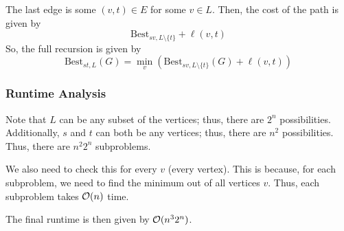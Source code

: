 \documentclass[letterpaper]{article}
\begin{document}
\bigskip 

The last edge is some $(v, t) \in E$ for some $v \in L$. Then, the cost of the path is given by 
\[\text{Best}_{sv, L \setminus \{t\}} + \ell(v, t)\]
So, the full recursion is given by 
\[\text{Best}_{st, L}(G) = \min_v \left(\text{Best}_{sv, L \setminus \{t\}}(G) + \ell(v, t)\right)\]

\subsubsection{Runtime Analysis}
Note that $L$ can be any subset of the vertices; thus, there are $2^n$ possibilities. Additionally, $s$ and $t$ can both be any vertices; thus, there are $n^2$ possibilities. Thus, there are $n^2 2^n$ subproblems. 

\bigskip 

We also need to check this for every $v$ (every vertex). This is because, for each subproblem, we need to find the minimum out of all vertices $v$. Thus, each subproblem takes $\mathcal{O}(n)$ time. 

\bigskip 

The final runtime is then given by $\mathcal{O}(n^3 2^n)$. 
\end{document}
